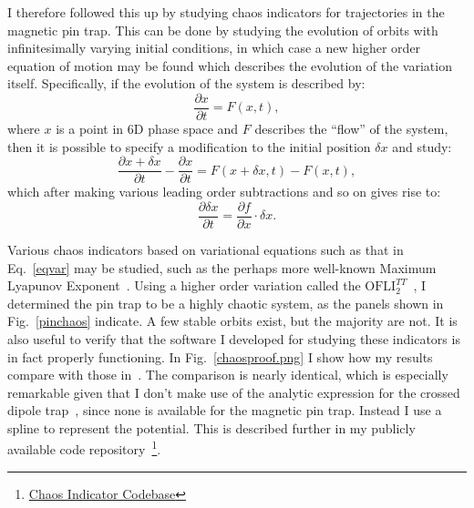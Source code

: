 \documentclass[defaultstyle,11pt]{thesis}
\begin{document}
I therefore followed this up by studying chaos indicators for trajectories in the magnetic pin trap.
This can be done by studying the evolution of orbits with infinitesimally varying initial conditions, in which case a new higher order equation of motion may be found which describes the evolution of the variation itself.
Specifically, if the evolution of the system is described by:
\begin{equation}
\frac{\partial x}{\partial t} = F(x,t),
\end{equation}
where $x$ is a point in 6D phase space and $F$ describes the ``flow'' of the system, then it is possible to specify a modification to the initial position $\delta x$ and study:
\begin{equation}
\frac{\partial x+\delta x}{\partial t} - \frac{\partial x}{\partial t}= F(x+\delta x,t) - F(x,t),
\end{equation}
which after making various leading order subtractions and so on gives rise to:
\begin{equation}
\frac{\partial \delta x}{\partial t} = \frac{\partial f}{\partial x}\cdot\delta x.  \label{eqvar}
\end{equation}

Various chaos indicators based on variational equations such as that in Eq.~\ref{eqvar} may be studied, such as the perhaps more well-known Maximum Lyapunov Exponent~\cite{wolf1985}.
Using a higher order variation called the $\text{OFLI}_2^{TT}$~\cite{Barrio2006}, I determined the pin trap to be a highly chaotic system, as the panels shown in Fig.~\ref{pinchaos} indicate.
A few stable orbits exist, but the majority are not.
It is also useful to verify that the software I developed for studying these indicators is in fact properly functioning.
In Fig.~\ref{chaosproof.png} I show how my results compare with those in~\cite{Gonzalez-Ferez2014}.
The comparison is nearly identical, which is especially remarkable given that I don't make use of the analytic expression for the crossed dipole trap~\citep[Eq.~6]{Gonzalez-Ferez2014}, since none is available for the magnetic pin trap.
Instead I use a spline to represent the potential.
This is described further in my publicly available code repository~\footnote{\href{https://github.com/dreens/ofli-OH-trapping}{Chaos Indicator Codebase}}.
\end{document}
